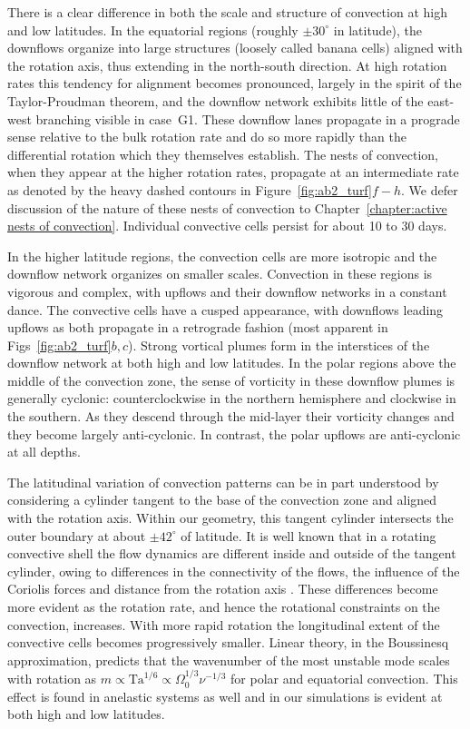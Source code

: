 There is a clear difference in both the scale and structure of
convection at high and low latitudes.  In the equatorial regions
(roughly $\pm30^\circ$ in latitude), the downflows organize into large
structures (loosely called banana cells) aligned
with the rotation axis, thus extending in the north-south direction.  At high rotation rates this tendency
for alignment becomes pronounced, largely in the spirit of the
Taylor-Proudman theorem, and the downflow network exhibits
little of the east-west branching visible in case~G1.
These downflow lanes propagate in a prograde sense relative
to the bulk rotation rate and do so more rapidly than the differential
rotation which they themselves establish.
%
The nests of convection,
when they appear at the higher rotation rates, propagate at an
intermediate rate as denoted by the heavy dashed contours in
Figure~\ref{fig:ab2_turf}$f-h$.  We defer discussion of the nature of
these nests of convection to Chapter~\ref{chapter:active nests of convection}.
%
Individual convective cells persist for about 10 to 30 days.   
%

In the higher latitude regions, the convection cells are more isotropic and the
downflow network organizes on smaller scales.
Convection in these regions is vigorous and complex, with upflows
and their downflow networks in a constant dance.
The convective cells have a cusped appearance, with downflows leading
upflows as both propagate in a retrograde fashion (most apparent in
Figs~\ref{fig:ab2_turf}$b,c$). 
Strong vortical plumes form in the interstices of the downflow network
at both high and low latitudes.  In the polar regions above the
middle of the convection zone, the sense of
vorticity in these downflow plumes is generally
cyclonic: counterclockwise in the northern
hemisphere and clockwise in the southern.  As they descend through the
mid-layer their vorticity changes and they become largely
anti-cyclonic.  In contrast, the polar upflows are anti-cyclonic
at all depths.   

\clearpage
The latitudinal variation of convection patterns can be in part understood by
considering a cylinder tangent to the base of the convection zone and aligned with
the rotation axis.  Within our geometry, this tangent
cylinder intersects the outer boundary at about $\pm 42^\circ$ of
latitude.  It is well known that in a rotating convective shell the
flow dynamics are different inside and outside of the tangent
cylinder, owing to differences in the connectivity of the flows, the
influence of the Coriolis forces and distance from the rotation axis
\citep[e.g.,][]{Busse_1970}.  These differences become more evident as
the rotation rate, and hence the rotational constraints on the
convection, increases.
With more rapid rotation the longitudinal extent of the convective cells
becomes progressively smaller.
%
%
Linear theory, in the Boussinesq approximation, predicts that the
wavenumber of the most unstable mode scales with rotation as
$m \propto \mathrm{Ta}^{1/6} \propto \Omega_0^{1/3}\nu^{-1/3}$ \citep[e.g.,][]{Chandrasekhar_1961,
  Dormy_et_al_2004} for polar and equatorial convection.  This effect
is found in anelastic systems as well \citep{Glatzmaier&Gilman_1981}
and in our simulations is evident at both high and low latitudes.  

